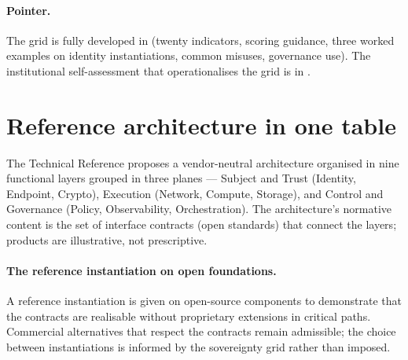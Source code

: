 \paragraph{Pointer.} The grid is fully developed in
 (twenty indicators, scoring
guidance, three worked examples on identity instantiations,
common misuses, governance use). The institutional self-assessment
that operationalises the grid is in
.

\section{Reference architecture in one table}
\label{sec:synth-architecture}

The Technical Reference proposes a vendor-neutral architecture
organised in nine functional layers grouped in three planes ---
Subject and Trust (Identity, Endpoint, Crypto), Execution
(Network, Compute, Storage), and Control and Governance (Policy,
Observability, Orchestration). The architecture's normative
content is the set of interface contracts (open standards) that
connect the layers; products are illustrative, not prescriptive.

\paragraph{The reference instantiation on open foundations.} A
reference instantiation is given on open-source components to
demonstrate that the contracts are realisable without proprietary
extensions in critical paths. Commercial alternatives that
respect the contracts remain admissible; the choice between
instantiations is informed by the sovereignty grid rather than
imposed.

